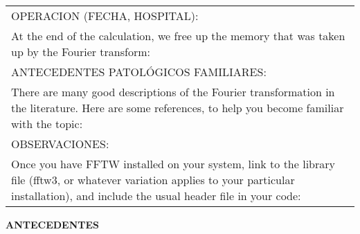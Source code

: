 \documentclass[10pt,a4paper]{article}
\begin{document}
{\begin{tabular}{|p{2cm}p{2cm}p{3cm}p{2cm}|}
\hline 
\multicolumn{4}{|l|}{\scriptsize{OPERACION (FECHA, HOSPITAL): }}\\
\multicolumn{4}{|p{12.5cm}|}{\scriptsize{At the end of the calculation, we free up the memory that was taken up by the Fourier transform:}}\\ 
\hline 
\multicolumn{4}{|l|}{\scriptsize{ANTECEDENTES PATOL\'OGICOS FAMILIARES:}}\\
\multicolumn{4}{|p{12.5cm}|}{\scriptsize{There are many good descriptions of the Fourier transformation in the literature. Here are some references, to help you become familiar with the topic:}}\\ 
\hline 
\multicolumn{4}{|l|}{\scriptsize{OBSERVACIONES:}}\\
\multicolumn{4}{|p{12.5cm}|}{\scriptsize{Once you have FFTW installed on your system, link to the library file (fftw3,  or whatever variation applies to your particular installation), and include the usual header file in your code:}}\\ 
\hline 
\end{tabular}}
\vspace{0.6cm}
\hspace{13cm}
\begin{flushleft}
\begin{LARGE}
\textbf{ANTECEDENTES}
\end{LARGE}
\end{flushleft}
\end{document}
